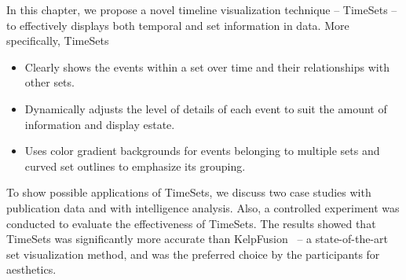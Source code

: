 In this chapter, we propose a novel timeline visualization technique -- TimeSets -- to effectively displays both temporal and set information in data. More specifically, TimeSets 

\begin{itemize}
	\item Clearly shows the events within a set over time and their relationships with other sets.
	\item Dynamically adjusts the level of details of each event to suit the amount of information and display estate.
	\item Uses color gradient backgrounds for events belonging to multiple sets and curved set outlines to emphasize its grouping.
\end{itemize}

To show possible applications of TimeSets, we discuss two case studies with publication data and with intelligence analysis. Also, a controlled experiment was conducted to evaluate the effectiveness of TimeSets. The results showed that TimeSets was significantly more accurate than KelpFusion~\cite{Meulemans2013} -- a state-of-the-art set visualization method, and was the preferred choice by the participants for aesthetics.
